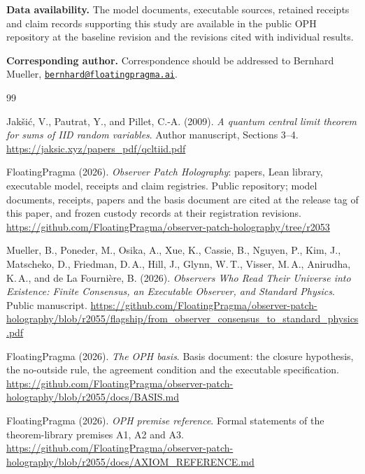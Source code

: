 \documentclass[11pt]{article}
\theoremstyle{definition}
\theoremstyle{remark}
\theoremstyle{plain}
\begin{document}
\noindent\textbf{Data availability.}
The model documents, executable sources, retained receipts and claim records
supporting this study are available in the public OPH repository at the
baseline revision \cite{ophrepo} and the revisions cited with individual results.

\noindent\textbf{Corresponding author.}
Correspondence should be addressed to Bernhard Mueller,
\href{mailto:bernhard@floatingpragma.ai}{\nolinkurl{bernhard@floatingpragma.ai}}.

{\footnotesize
{}
\begin{thebibliography}{99}
\setlength{\itemsep}{0pt}\setlength{\parsep}{0pt}

Jak\v{s}i\'c, V., Pautrat, Y., and Pillet, C.-A. (2009).
\emph{A quantum central limit theorem for sums of IID random variables}.
Author manuscript, Sections 3--4.
\url{https://jaksic.xyz/papers_pdf/qcltiid.pdf}

FloatingPragma (2026). \emph{Observer Patch Holography}: papers, Lean library,
executable model, receipts and claim registries. Public repository; model
documents, receipts, papers and the basis document are cited at the release
tag of this paper, and frozen custody records at their registration
revisions.
\url{https://github.com/FloatingPragma/observer-patch-holography/tree/r2053}

Mueller, B., Poneder, M., Osika, A., Xue, K., Cassie, B., Nguyen, P., Kim, J.,
Matscheko, D., Friedman, D.\,A., Hill, J., Glynn, W.\,T., Visser, M.\,A., Anirudha, K.\,A., and de La Fourni\`ere, B. (2026). \emph{Observers Who Read Their Universe into Existence: Finite Consensus, an Executable Observer, and Standard Physics}. Public manuscript.
\url{https://github.com/FloatingPragma/observer-patch-holography/blob/r2055/flagship/from_observer_consensus_to_standard_physics.pdf}

FloatingPragma (2026). \emph{The OPH basis}. Basis document: the closure hypothesis, the no-outside rule, the agreement condition and the executable specification.
\url{https://github.com/FloatingPragma/observer-patch-holography/blob/r2055/docs/BASIS.md}

FloatingPragma (2026). \emph{OPH premise reference}. Formal statements of the theorem-library premises A1, A2 and A3.
\url{https://github.com/FloatingPragma/observer-patch-holography/blob/r2055/docs/AXIOM_REFERENCE.md}


\end{thebibliography}}
\end{document}
